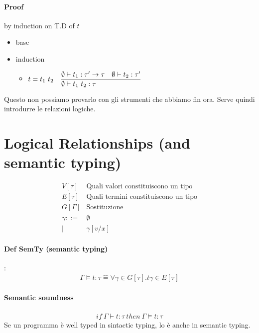 \documentclass{article}
\newcommand{\st}[3][]{\ensuremath \displaystyle\frac{#3\hfill}{#2\hfill} \text{#1}}
\begin{document}
\paragraph{Proof} by induction on T.D of $t$ \\
\begin{itemize}
    \item base 
    \item induction \begin{itemize}
            \item $t=t_1\ t_2\quad \st{\emptyset\vdash t_1\ t_2:\tau}{\emptyset\vdash t_1:\tau'\to\tau\quad\emptyset\vdash t_2:\tau'}$
        \end{itemize}
\end{itemize}
Questo non possiamo provarlo con gli strumenti che abbiamo fin ora. Serve quindi introdurre le relazioni logiche.

\section{Logical Relationships (and semantic typing)}
\begin{align*}
    V\left[\tau\right] & \text{Quali valori constituiscono un tipo} \\
    E\left[\tau\right] & \text{Quali termini constituiscono un tipo}\\
    G\left[\Gamma\right] & \text{Sostituzione} \\
    \gamma ::=&\emptyset \\
    |&\gamma[v/x] 
\end{align*}

\paragraph{Def SemTy (semantic typing)}: \begin{align*}
    \Gamma \vDash t:\tau \hat{=} \forall \gamma\in G[\tau].t\gamma\in E[\tau] 
\end{align*}

\paragraph{Semantic soundness}
\begin{align*}
    if\ \Gamma\vdash t:\tau\ then\ \Gamma \vDash t:\tau
\end{align*}
Se un programma è well typed in sintactic typing, lo è anche in semantic typing.
\end{document}
